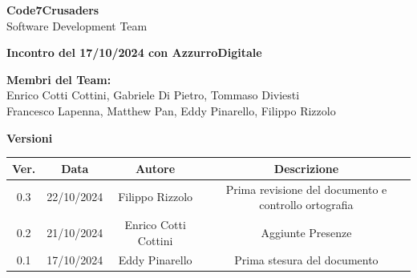 \documentclass{article}
\begin{document}
\begin{titlepage}
    {\Huge \textbf{Code7Crusaders}}\\
    \vspace{0.5cm}
    {\Large Software Development Team}\\
    \vspace{2cm}
    
    {\large \textbf{Incontro del 17/10/2024 con AzzurroDigitale}}\\
    \vspace{5cm}

    \textbf{Membri del Team:}\\
    Enrico Cotti Cottini, Gabriele Di Pietro, Tommaso Diviesti \\
    Francesco Lapenna, Matthew Pan, Eddy Pinarello, Filippo Rizzolo \\
    \vspace{0.5cm}
    
    \vspace{1cm}
\end{titlepage}

\begin{center}
    \textbf{Versioni} %
    \\
    \begin{tabular}{|c|c|c|c|}
        \hline
        \textbf{Ver.} & \textbf{Data} & \textbf{Autore} & \textbf{Descrizione} \\
        \hline
        0.3 & 22/10/2024 & Filippo Rizzolo & Prima revisione del documento e controllo ortografia \\ 
        \hline
        0.2 & 21/10/2024 & Enrico Cotti Cottini & Aggiunte Presenze \\
        \hline
        0.1 & 17/10/2024 & Eddy Pinarello & Prima stesura del documento  \\ 
        \hline
    \end{tabular}
\end{center}

\newpage
\tableofcontents
\newpage

\end{document}
